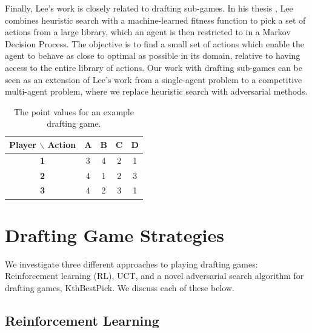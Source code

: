 \documentclass[letterpaper]{article}
\numberwithin{equation}{section}
\numberwithin{theorem}{section}
\numberwithin{lemma}{section}
\numberwithin{df}{section}
\begin{document}

Finally, Lee's work is closely related to drafting sub-games.  In his thesis \cite{GregLeeThesis}, Lee combines heuristic search with a machine-learned fitness function to pick a set of actions from a large library, which an agent is then restricted to in a Markov Decision Process.  The objective is to find a small set of actions which enable the agent to behave as close to optimal as possible in its domain, relative to having access to the entire library of actions.  Our work with drafting sub-games can be seen as an extension of Lee's work from a single-agent problem to a competitive multi-agent problem, where we replace heuristic search with adversarial methods. 

\begin{table}[t]
	\centering
		\caption{The point values for an example drafting game.}
		\label{tab:KthEx}
		\begin{footnotesize}
		\begin{tabular}{|c|c|c|c|c|}
			\hline
			\bf Player $\backslash$ Action & \bf A & \bf B & \bf C & \bf D \\
			\hline
			\bf 1 & 3 & 4 & 2 & 1 \\
			\hline
			\bf 2 & 4 & 1 & 2 & 3 \\
			\hline
			\bf 3 & 4 & 2 & 3 & 1 \\
			\hline
		\end{tabular}
		\end{footnotesize}
\end{table}

\section{Drafting Game Strategies}
\label{sec:drafting}

We investigate three different approaches to playing drafting games: Reinforcement learning (RL), UCT, and a novel adversarial search algorithm for drafting games, KthBestPick.  We discuss each of these below.

\subsection{Reinforcement Learning}
\end{document}
